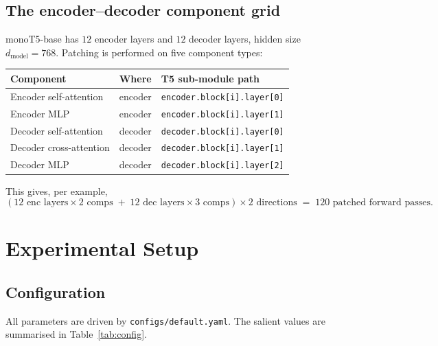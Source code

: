 \documentclass[11pt]{article}
\begin{document}
\subsection{The encoder--decoder component grid}

monoT5-base has $12$ encoder layers and $12$ decoder layers, hidden size
$d_{\text{model}}=768$. Patching is performed on five component types:

\begin{center}
\begin{tabular}{lll}
\toprule
Component & Where & T5 sub-module path \\
\midrule
Encoder self-attention  & encoder & \texttt{encoder.block[i].layer[0]} \\
Encoder MLP             & encoder & \texttt{encoder.block[i].layer[1]} \\
Decoder self-attention  & decoder & \texttt{decoder.block[i].layer[0]} \\
Decoder cross-attention & decoder & \texttt{decoder.block[i].layer[1]} \\
Decoder MLP             & decoder & \texttt{decoder.block[i].layer[2]} \\
\bottomrule
\end{tabular}
\end{center}

This gives, per example,
\[
(12 \text{ enc layers} \times 2 \text{ comps} \;+\; 12 \text{ dec layers} \times 3 \text{ comps})
\times 2 \text{ directions} \;=\; 120 \text{ patched forward passes.}
\]

\section{Experimental Setup}

\subsection{Configuration}

All parameters are driven by \texttt{configs/default.yaml}. The salient values
are summarised in Table~\ref{tab:config}.
\end{document}
